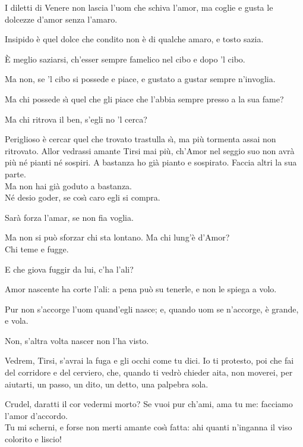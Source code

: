 \documentclass{book}
\begin{document}
	\5 I diletti di Venere non lascia
	l'uom che schiva l'amor, ma coglie e gusta
	le dolcezze d'amor senza l'amaro.

	\2 Insipido \`e quel dolce che condito
	non \`e di qualche amaro, e tosto sazia.

	\5 \`E meglio saziarsi, ch'esser sempre
	famelico nel cibo e dopo 'l cibo.

	\2 Ma non, se 'l cibo si possede e piace,
	e gustato a gustar sempre n'invoglia.

	\5 Ma chi possede s\`{\i} quel che gli piace
	che l'abbia sempre presso a la sua fame?

	\2 Ma chi ritrova il ben, s'egli no 'l cerca?

	\5 Periglioso \`e cercar quel che trovato
	trastulla s\`{\i}, ma pi\`u tormenta assai
	non ritrovato. Allor vedrassi amante
	Tirsi mai pi\`u, ch'Amor nel seggio suo
	non avr\`a pi\`u n\'e pianti n\'e sospiri.
	A bastanza ho gi\`a pianto e sospirato.
	Faccia altri la sua parte. \\

   \2 Ma non hai
	gi\`a goduto a bastanza. \\

   \5 N\'e desio
	goder, se cos\`{\i} caro egli si compra.

	\2 Sar\`a forza l'amar, se non fia voglia.

	\5 Ma non si pu\`o sforzar chi sta lontano.
	\2 Ma chi lung'\`e d'Amor? \\

   \5 Chi teme e fugge.

	\2 E che giova fuggir da lui, c'ha l'ali?

	\5 Amor nascente ha corte l'ali: a pena
	pu\`o su tenerle, e non le spiega a volo.

	\2 Pur non s'accorge l'uom quand'egli nasce;
	e, quando uom se n'accorge, \`e grande, e vola.

	\5 Non, s'altra volta nascer non l'ha visto.

	\2 Vedrem, Tirsi, s'avrai la fuga e gli occhi
	come tu dici. Io ti protesto, poi
	che fai del corridore e del cerviero,
	che, quando ti vedr\`o chieder aita,
	non moverei, per aiutarti, un passo,
	un dito, un detto, una palpebra sola.

	\5 Crudel, daratti il cor vedermi morto?
	Se vuoi pur ch'ami, ama tu me: facciamo
	l'amor d'accordo. \\

   \2 Tu mi scherni, e forse
	non merti amante cos\`{\i} fatta: ahi quanti
	n'inganna il viso colorito e liscio!
\end{document}

